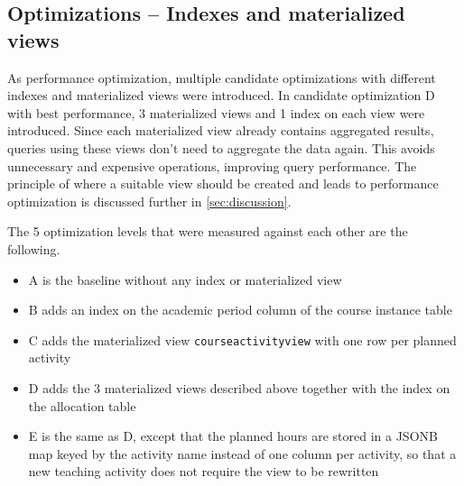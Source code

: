 \documentclass[a4paper]{scrartcl}
\renewcommand{\_}{\textunderscore\allowbreak}
\begin{document}
\subsection{Optimizations -- Indexes and materialized views}

As performance optimization, multiple candidate optimizations with different indexes and materialized views were introduced. In candidate optimization D with best performance, 3 materialized views and 1 index on each view were introduced. Since each materialized view already contains aggregated results, queries using these views don't need to aggregate the data again. This avoids unnecessary and expensive operations, improving query performance. The principle of where a suitable view should be created and leads to performance optimization is discussed further in \ref{sec:discussion}.


The 5 optimization levels that were measured against each other are the following.

\begin{itemize}
  \item A is the baseline without any index or materialized view
  \item B adds an index on the academic period column of the course instance table
  \item C adds the materialized view \texttt{course\_activity\_view} with one row per planned activity
  \item D adds the 3 materialized views described above together with the index on the allocation table
  \item E is the same as D, except that the planned hours are stored in a JSONB map keyed by the activity name instead of one column per activity, so that a new teaching activity does not require the view to be rewritten
\end{itemize}
\end{document}
